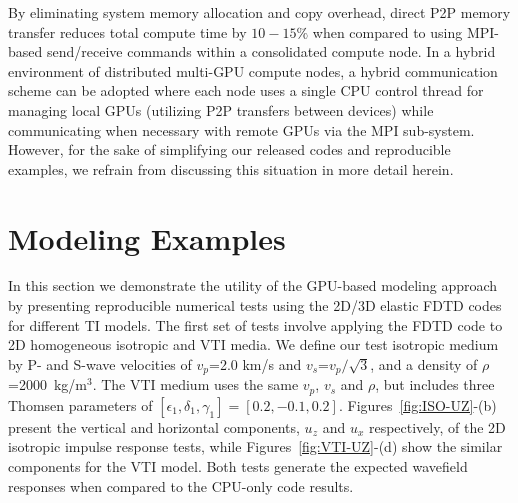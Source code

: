 
By eliminating system memory allocation and copy overhead, direct P2P memory transfer reduces total compute time by $10-15\%$ when compared to using MPI-based send/receive commands within a consolidated compute node.  In a hybrid environment of distributed multi-GPU compute nodes, a hybrid communication scheme can be adopted where each node uses a single CPU control thread for managing local GPUs (utilizing P2P transfers between devices) while communicating when necessary with remote GPUs via the MPI sub-system.  However, for the sake of simplifying our released codes and reproducible examples, we refrain from discussing this situation in more detail herein.

\section{Modeling Examples}

In this section we demonstrate the utility of the GPU-based modeling approach by presenting reproducible numerical tests using the 2D/3D elastic FDTD codes for different TI models.  The first set of tests involve applying the FDTD code to 2D homogeneous isotropic and VTI media.  We define our test isotropic medium by P- and S-wave velocities of $v_p$=2.0 km/s and $v_s$=$v_p/\sqrt{3}$, and a density of $\rho$=2000~kg/m$^3$.  The VTI medium uses the same $v_p$, $v_s$ and $\rho$, but includes three Thomsen parameters \cite[]{Thomsen86} of $[\epsilon_1,\delta_1,\gamma_1] = [0.2, -0.1, 0.2]$.  Figures~\ref{fig:ISO-UZ}-(b) present the vertical and horizontal components, $u_z$ and $u_x$ respectively, of the 2D isotropic impulse response tests, while Figures~\ref{fig:VTI-UZ}-(d) show the similar components for the VTI model.  Both tests generate the expected wavefield responses when compared to the CPU-only code results.




